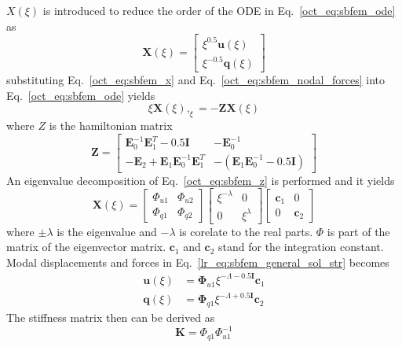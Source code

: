 %
$X(\xi)$ is introduced to reduce the order of the ODE in Eq.~\ref{oct_eq:sbfem_ode} as
\begin{equation}
    \mathbf{X} (\xi) =
    \begin{bmatrix}
        \xi^{0.5} \mathbf{u}(\xi) \\
        \xi^{-0.5} \mathbf{q}(\xi)
    \end{bmatrix}
\label{oct_eq:sbfem_x}
\end{equation}
%
substituting Eq.~\ref{oct_eq:sbfem_x} and Eq.~\ref{oct_eq:sbfem_nodal_forces} into Eq.~\ref{oct_eq:sbfem_ode} yields
\begin{equation}
    \xi \mathbf{X} (\xi),_\xi =
    -\mathbf{Z} \mathbf{X} (\xi)
\end{equation}
%
where $Z$ is the hamiltonian matrix
\begin{equation}
    \mathbf{Z} =
    \begin{bmatrix}
        \mathbf{E}_0^{-1} \mathbf{E}_1^T - 0.5 \mathbf{I}   &   -\mathbf{E}^{-1}_0 \\
        -\mathbf{E}_2 + \mathbf{E}_1 \mathbf{E}_0^{-1} \mathbf{E}_1^T   &   -(
            \mathbf{E}_1 \mathbf{E}_0^{-1} - 0.5 \mathbf{I}
        )
    \end{bmatrix}
\label{oct_eq:sbfem_z}
\end{equation}
%
An eigenvalue decomposition of Eq.~\ref{oct_eq:sbfem_z} is performed and it yields
\begin{equation}
    \mathbf{X} (\xi) =
    \begin{bmatrix}
        \Phi_{u1}   &   \Phi_{u2} \\
        \Phi_{q1}   &   \Phi_{q2}
    \end{bmatrix}
    \begin{bmatrix}
        \xi^{-\lambda}  &   0 \\
        0   &   \xi^{\lambda}
    \end{bmatrix}
    \begin{bmatrix}
        \mathbf{c}_1  &   0   \\
        0   &   \mathbf{c}_2
    \end{bmatrix}
\label{oct_eq:sbfem_eigenvalue}
\end{equation}
%
where $\pm\lambda$ is the eigenvalue and $-\lambda$ is corelate to the real parts.
$\Phi$ is part of the matrix of the eigenvector matrix.
$\mathbf{c}_1$ and $\mathbf{c}_2$ stand for the integration constant.
Modal displacements and forces in Eq.~\ref{lr_eq:sbfem_general_sol_str} becomes
\begin{subequations}
\begin{align}
    \mathbf{u}(\xi) &= \mathbf{\Phi}_{u1} \xi^{-\Lambda-0.5\mathbf{I}} \mathbf{c}_1
    \label{oct_eq:sbfem_general_sol_disp} \\
    \mathbf{q}(\xi) &= \mathbf{\Phi}_{q1} \xi^{-\Lambda+0.5\mathbf{I}} \mathbf{c}_2
    \label{oct_eq:sbfem_general_sol_str}
\end{align}
\end{subequations}
%
The stiffness matrix then can be derived as
\begin{equation}
    \mathbf{K} = \Phi_{q1} \Phi_{u1}^{-1}
\end{equation}
